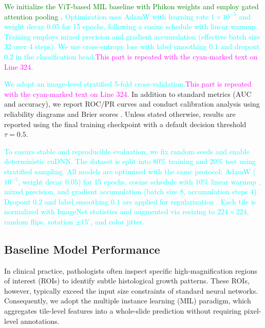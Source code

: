 \documentclass[journal,twoside,web]{ieeecolor}
\begin{document}
\textcolor{green}{We initialize the ViT-based MIL baseline with Phikon weights \cite{filiot2023scaling} and employ gated attention pooling \cite{ilse2018attention}.} \textcolor{cyan}{Optimization uses AdamW \cite{loshchilov2017decoupled} with learning rate $1 \times 10^{-5}$ and weight decay $0.05$ for 15 epochs, following a cosine schedule with linear warmup. Training employs mixed precision \cite{micikevicius2017mixed} and gradient accumulation (effective batch size 32 over 4 steps). We use cross-entropy loss with label smoothing $0.1$ \cite{szegedy2016rethinking} and dropout $0.2$ in the classification head.}\textcolor{magenta}{This part is repeated with the cyan-marked text on Line 324.}

\textcolor{cyan}{We adopt an image-level stratified 5-fold cross-validation.}\textcolor{magenta}{This part is repeated with the cyan-marked text on Line 324.} In addition to standard metrics (AUC and accuracy), we report ROC/PR curves and conduct calibration analysis using reliability diagrams and Brier scores \cite{guo2017calibration}. Unless stated otherwise, results are reported using the final training checkpoint with a default decision threshold $\tau = 0.5$.

\textcolor{cyan}{To ensure stable and reproducible evaluation, we fix random seeds and enable deterministic cuDNN. The dataset is split into 80\% training and 20\% test using stratified sampling. All models are optimized with the same protocol: AdamW \cite{loshchilov2017decoupled} ($10^{-5}$, weight decay $0.05$) for 15 epochs, cosine schedule with 10\% linear warmup \cite{loshchilov2016sgdr}, mixed precision, and gradient accumulation (batch size 8, accumulation steps 4). Dropout $0.2$ and label smoothing $0.1$ are applied for regularization \cite{szegedy2016rethinking}. Each tile is normalized with ImageNet statistics \cite{russakovsky2015imagenet} and augmented via resizing to $224 \times 224$, random flips, rotation $\pm 15^\circ$, and color jitter. }

\subsection{Baseline Model Performance}\label{S3-2}

In clinical practice, pathologists often inspect specific high-magnification regions of interest (ROIs) to identify subtle histological growth patterns. These ROIs, however, typically exceed the input size constraints of standard neural networks. Consequently, we adopt the multiple instance learning (MIL) paradigm, which aggregates tile-level features into a whole-slide prediction without requiring pixel-level annotations.
\end{document}
